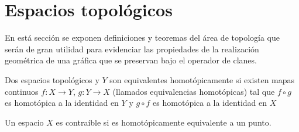 \section{Espacios topológicos}
En está sección se exponen definiciones y teoremas del área de topología que serán de gran utilidad para evidenciar las propiedades de la realización geométrica de una gráfica que se preservan bajo el operador de clanes. 
\begin{Defi}
Dos espacios topológicos  y $Y$ son equivalentes homotópicamente
si existen mapas continuos  $f\colon X\rightarrow Y$, $g\colon Y\rightarrow X$ (llamados equivalencias homotópicas) tal que $f\circ g$ es homotópica a la identidad en $Y$ y $g\circ f$ es homotópica a la identidad en $X$
\end{Defi}

\begin{Defi}
Un espacio $X$ es contraíble si es homotópicamente equivalente a un punto.
\end{Defi}

